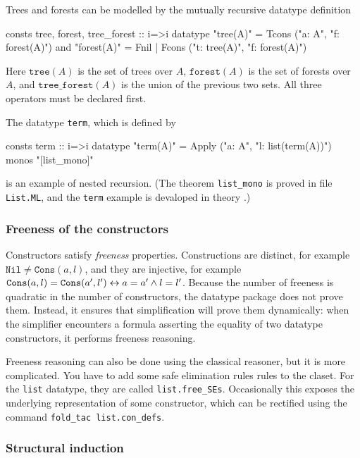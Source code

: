 Trees and forests can be modelled by the mutually recursive datatype
definition
\begin{ttbox}
consts     tree, forest, tree_forest :: i=>i
datatype  "tree(A)"   = Tcons ("a: A",  "f: forest(A)")
and       "forest(A)" = Fnil  |  Fcons ("t: tree(A)",  "f: forest(A)")
\end{ttbox}
Here $\texttt{tree}(A)$ is the set of trees over $A$, $\texttt{forest}(A)$ is
the set of forests over $A$, and  $\texttt{tree_forest}(A)$ is the union of
the previous two sets.  All three operators must be declared first.

The datatype \texttt{term}, which is defined by
\begin{ttbox}
consts     term :: i=>i
datatype  "term(A)" = Apply ("a: A", "l: list(term(A))")
  monos "[list_mono]"
\end{ttbox}
is an example of nested recursion.  (The theorem \texttt{list_mono} is proved
in file \texttt{List.ML}, and the \texttt{term} example is devaloped in theory
.)

\subsubsection{Freeness of the constructors}

Constructors satisfy {\em freeness} properties.  Constructions are distinct,
for example $\texttt{Nil}\not=\texttt{Cons}(a,l)$, and they are injective, for
example $\texttt{Cons}(a,l)=\texttt{Cons}(a',l') \leftrightarrow a=a' \wedge l=l'$.
Because the number of freeness is quadratic in the number of constructors, the
datatype package does not prove them.  Instead, it ensures that simplification
will prove them dynamically: when the simplifier encounters a formula
asserting the equality of two datatype constructors, it performs freeness
reasoning.  

Freeness reasoning can also be done using the classical reasoner, but it is
more complicated.  You have to add some safe elimination rules rules to the
claset.  For the \texttt{list} datatype, they are called
\texttt{list.free_SEs}.  Occasionally this exposes the underlying
representation of some constructor, which can be rectified using the command
\hbox{\tt fold_tac list.con_defs}.


\subsubsection{Structural induction}

